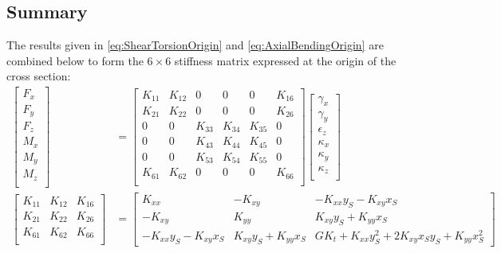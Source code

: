 \documentclass[11pt]{article}
\newcommand{\sh}{{S}}
\newcommand{\GK}{G\!K_t}
\begin{document}
\subsection{Summary}
The results given in \autoref{eq:ShearTorsionOrigin} and \autoref{eq:AxialBendingOrigin} are combined below to form the $6\times 6$ stiffness matrix expressed at the origin of the cross section:
\begin{align}
    \begin{bmatrix}
    F_x \\ F_y\\ F_z \\ M_x \\ M_y\\ M_z\\ 
    \end{bmatrix}
&=
    \begin{bmatrix}
K_{11} & K_{12} & 0      & 0      & 0      & K_{16} \\
K_{21} & K_{22} & 0      & 0      & 0      & K_{26} \\
0      & 0      & K_{33} & K_{34} & K_{35} & 0      \\
0      & 0      & K_{43} & K_{44} & K_{45} & 0      \\
0      & 0      & K_{53} & K_{54} & K_{55} & 0      \\
K_{61} & K_{62} & 0      & 0       & 0  & K_{66} \\
\end{bmatrix}
% 
    \begin{bmatrix}
    \gamma_{x} \\ \gamma_{y} \\     \epsilon_z \\ \kappa_x \\ \kappa_y\\ \kappa_z \\
    \end{bmatrix}
    \\
    \begin{bmatrix}
K_{11} &  K_{12} & K_{16} \\
K_{21} &  K_{22} & K_{26} \\
K_{61} &  K_{62} & K_{66} \\
\end{bmatrix}
&=
    \begin{bmatrix}
K_{xx} & - K_{xy} & - K_{xx} y_{\sh} - K_{xy} x_{\sh}\\- K_{xy} & K_{yy} & K_{xy} y_{\sh} + K_{yy} x_{\sh}\\- K_{xx} y_{\sh} - K_{xy} x_{\sh} & K_{xy} y_{\sh} + K_{yy} x_{\sh} & \GK + K_{xx} y_{\sh}^{2} + 2 K_{xy} x_{\sh} y_{\sh} + K_{yy} x_{\sh}^{2}

\end{bmatrix}
\end{align}
\end{document}
